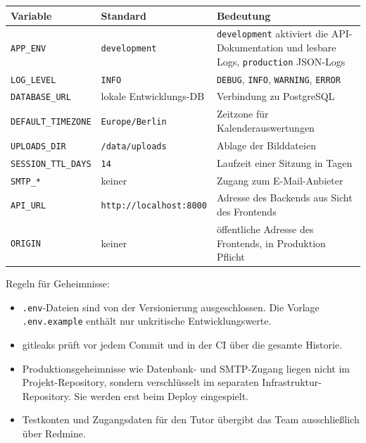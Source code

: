 \documentclass[11pt,a4paper]{article}
\begin{document}
\begin{tabularx}{\linewidth}{@{}>{\hsize=0.76\hsize\RaggedRight\arraybackslash}X >{\hsize=0.79\hsize\RaggedRight\arraybackslash}X >{\hsize=1.45\hsize\RaggedRight\arraybackslash}X@{}}
\toprule
\textbf{Variable} & \textbf{Standard} & \textbf{Bedeutung} \\
\midrule
\endhead
\texttt{APP\_\allowbreak{}ENV} & \texttt{development} & \texttt{development} aktiviert die API-Dokumentation und lesbare Logs, \texttt{production} JSON-Logs \\
\texttt{LOG\_\allowbreak{}LEVEL} & \texttt{INFO} & \texttt{DEBUG}, \texttt{INFO}, \texttt{WARNING}, \texttt{ERROR} \\
\texttt{DATABASE\_\allowbreak{}URL} & lokale Entwicklungs-DB & Verbindung zu PostgreSQL \\
\texttt{DEFAULT\_\allowbreak{}TIMEZONE} & \texttt{Europe/\allowbreak{}Berlin} & Zeitzone für Kalenderauswertungen \\
\texttt{UPLOADS\_\allowbreak{}DIR} & \texttt{/\allowbreak{}data/\allowbreak{}uploads} & Ablage der Bilddateien \\
\texttt{SESSION\_\allowbreak{}TTL\_\allowbreak{}DAYS} & \texttt{14} & Laufzeit einer Sitzung in Tagen \\
\texttt{SMTP\_\allowbreak{}*} & keiner & Zugang zum E-Mail-Anbieter \\
\texttt{API\_\allowbreak{}URL} & \texttt{http:/\allowbreak{}/\allowbreak{}localhost:8000} & Adresse des Backends aus Sicht des Frontends \\
\texttt{ORIGIN} & keiner & öffentliche Adresse des Frontends, in Produktion Pflicht \\
\bottomrule
\end{tabularx}

Regeln für Geheimnisse:

\begin{itemize}
\item \texttt{.env}-Dateien sind von der Versionierung ausgeschlossen. Die Vorlage \texttt{.env.example} enthält nur unkritische Entwicklungswerte.
\item gitleaks prüft vor jedem Commit und in der CI über die gesamte Historie.
\item Produktionsgeheimnisse wie Datenbank- und SMTP-Zugang liegen nicht im Projekt-Repository, sondern verschlüsselt im separaten Infrastruktur-Repository. Sie werden erst beim Deploy eingespielt.
\item Testkonten und Zugangsdaten für den Tutor übergibt das Team ausschließlich über Redmine.
\end{itemize}
\end{document}
